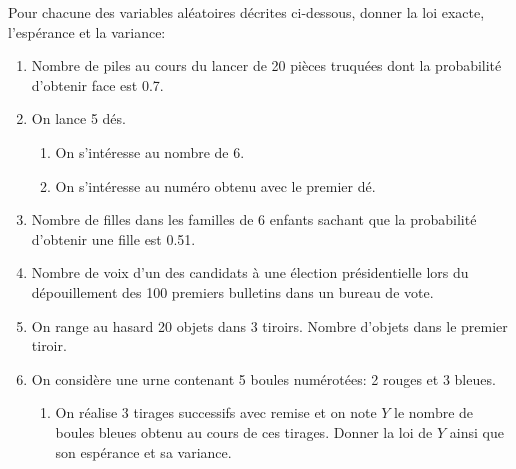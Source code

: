 \documentclass[a4paper, 11pt]{article}
\begin{document}
\newpage
\begin{exemple}  \;
	Pour chacune des variables al\'eatoires d\'ecrites ci-dessous, donner la loi exacte, l'esp\'erance et la variance:
	\begin{enumerate}
		\item Nombre de piles au cours du lancer de 20 pi\`eces truqu\'ees dont la probabilit\'e d'obtenir face est 0.7.
		\item On lance 5 d\'es.
		      \begin{enumerate}
			      \item On s'int\'eresse au nombre de 6.
			      \item On s'int\'eresse au num\'ero obtenu avec le premier d\'e.
		      \end{enumerate}
		\item Nombre de filles dans les familles de 6 enfants sachant que la probabilit\'e d'obtenir une fille est 0.51.
		\item Nombre de voix d'un des candidats \`a une \'election pr\'esidentielle lors du d\'epouillement des 100 premiers bulletins dans un bureau de vote.
		\item On range au hasard 20 objets dans 3 tiroirs. Nombre d'objets dans le premier tiroir.
\item 	On consid\`ere une urne contenant 5 boules num\'erot\'ees: 2 rouges et 3 bleues.
	\begin{enumerate}
		\item On r\'ealise 3 tirages successifs avec remise et on note $Y$ le nombre de boules bleues obtenu au cours de ces tirages. Donner la loi de $Y$ ainsi que son esp\'erance et sa variance.

\end{enumerate}
\end{enumerate}
\end{exemple}
\end{document}
